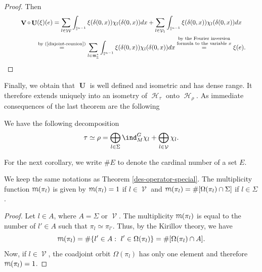 \documentclass[pdftex]{sigma}
\DeclareMathOperator{\U}{\mathbf{U}}
\DeclareMathOperator{\V}{\mathbf{V}} \DeclareMathOperator{\Aut}{Aut}
\DeclareMathOperator{\nongen}{\mathcal{V}}
\DeclareMathOperator{\gen}{\mathcal{W}}
\DeclareMathOperator{\Hi}{\mathscr{H}}
\def\mult{\mbox{\usefont{T1}{cmfr}{m}{it}
  \selectfont m}}
\def\tore{{\mathbb I}}
\begin{document}
\begin{proof}
Then
\begin{gather*}
\V\circ \U(\xi)(e)  =  \sum_{l\in \gen} \int_{\tore^{n-1}}
\xi(\delta(0, x)) \chi_l( \delta(0, x)) dx  + \sum_{l\in \nongen_1}
\int_{\tore^{n-1}}
    \xi(\delta(0, x)) \chi_{l}(\delta(0, x))  dx\\
\hphantom{\V\circ \U(\xi)(e)}{}
 \overset{\text{by (\ref{disjoint-reunion})}}{=}
   \sum_{l\in \frak m_{\mathbb{Z}}^*} \int_{\tore^{n-1}}
\xi(\delta(0, x))
\chi_l( \delta(0, x)) dx
\overset{\mbox{\scriptsize $\begin{array}{@{}c@{}}\text{by the Fourier inversion} \\ \text{formula to the variable  $x$}\end{array}$}}{=} \xi(e). \tag*{\qed}
\end{gather*}\renewcommand{\qed}{}
\end{proof}

Finally, we obtain that
 $\U$ is well def\/ined and isometric and
has dense range. It therefore extends uniquely into an isometry of
$\Hi_\tau$ onto $\Hi_\rho$.  As  immediate consequences of the last
theorem are the following


\begin{corollary} We have the following decomposition
\begin{gather*}%
\tau \simeq \rho =   \bigoplus_{l \in \Sigma}\ind_M^G\chi_l +
\bigoplus_{l\in \nongen} \chi_l.
\end{gather*}
\end{corollary}


For the next corollary, we write $\# E$ to denote the cardinal
number of a set $E$.
\begin{corollary}
We keep the same notations as Theorem  {\rm  \ref{des-operator-special}}.
The multiplicity function $\mult(\pi_l)$ is given by $\mult(\pi_l) =
1 $ if $l \in \nongen$ and  $\mult(\pi_l) = \#[\Omega(\pi_l) \cap
\Sigma] $ if $l \in \Sigma$.
\end{corollary}

\begin{proof} Let $l\in A$, where $A=\Sigma$ or $\nongen$. The
multiplicity $\mult(\pi_l)$ is equal to the number of $l'\in A$ such
that $\pi_l\simeq\pi_{l'}$. Thus, by the Kirillov theory, we have
\[
\mult(\pi_l)=\#\{l'\in A:\ l'\in \Omega(\pi_l)\}= \#[\Omega(\pi_l) \cap
A].
\]
 Now, if $l\in \nongen$, the coadjoint orbit $\Omega(\pi_l)$
has only one element and therefore $\mult(\pi_l)=1$.
\end{proof}
\end{document}
